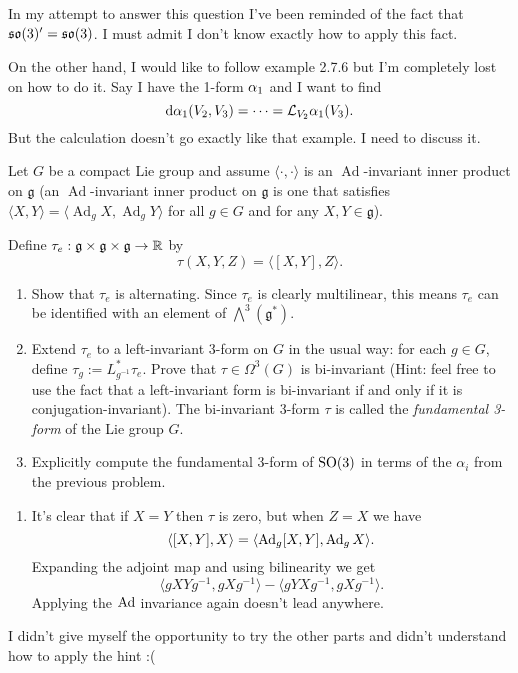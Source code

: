 \documentclass[12pt]{memoir}
\begin{document}
\begin{ptcbr}
In my attempt to answer this question I've been reminded of the fact that $\mathfrak{so}(3)'=\mathfrak{so}(3)$. I must admit I don't know exactly how to apply this fact.\par
On the other hand, I would like to follow example 2.7.6 but I'm completely lost on how to do it. Say I have the 1-form $\alpha_1$ and I want to find
$$\dd\alpha_1(V_2,V_3)=\dots=\mathcal{L}_{V_2}\alpha_1(V_3).$$
But the calculation doesn't go exactly like that example. I need to discuss it.
\end{ptcbr}
\begin{Ej}
    Let $G$ be a compact Lie group and assume $\langle \cdot , \cdot \rangle$ is an $\operatorname{Ad}$-invariant inner product on $\mathfrak{g}$ (an $\operatorname{Ad}$-invariant inner product on $\mathfrak{g}$ is one that satisfies $\langle X,Y \rangle = \langle \operatorname{Ad}_g X, \operatorname{Ad}_g Y \rangle$ for all $g \in G$ and for any $X,Y \in \mathfrak{g}$). 
	
	Define $\tau_e: \mathfrak{g} \times \mathfrak{g} \times \mathfrak{g} \to \mathbb{R}$ by
	\[
		\tau(X,Y,Z) = \langle [X,Y], Z\rangle.
	\]
	\begin{enumerate}
		\item Show that $\tau_e$ is alternating. Since $\tau_e$ is clearly multilinear, this means $\tau_e$ can be identified with an element of $\bigwedge^3(\mathfrak{g}^*)$.
		\item Extend $\tau_e$ to a left-invariant 3-form on $G$ in the usual way: for each $g \in G$, define $\tau_g := L_{g^{-1}}^* \tau_e$. Prove that $\tau \in \Omega^3(G)$ is bi-invariant (Hint: feel free to use the fact that a left-invariant form is bi-invariant if and only if it is conjugation-invariant). The bi-invariant 3-form $\tau$ is called the \emph{fundamental 3-form} of the Lie group $G$.
		\item Explicitly compute the fundamental 3-form of $\operatorname{SO}(3)$ in terms of the $\alpha_i$ from the previous problem. 
	\end{enumerate}
\end{Ej}

\begin{ptcbr}
\begin{enumerate}
	\item It's clear that if $X=Y$ then $\tau$ is zero, but when $Z=X$ we have 
	$$\langle[X,Y],X\rangle=\langle\operatorname{Ad}_g[X,Y],\operatorname{Ad}_gX\rangle.$$
	Expanding the adjoint map and using bilinearity we get
	$$\langle gXYg^{-1},gXg^{-1}\rangle-\langle gYXg^{-1},gXg^{-1}\rangle.$$
	Applying the $\operatorname{Ad}$ invariance again doesn't lead anywhere. 
\end{enumerate}
I didn't give myself the opportunity to try the other parts and didn't understand how to apply the hint :(
\end{ptcbr}
\end{document}
